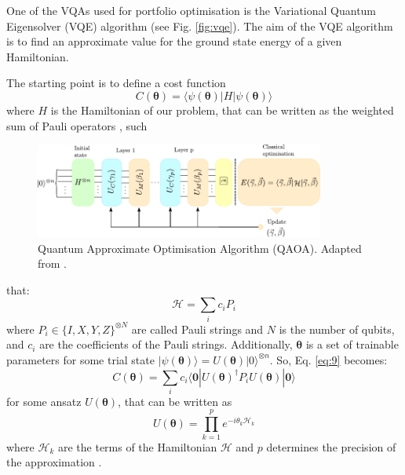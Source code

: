 \documentclass[prx,twocolumn,floatfix,superscriptaddress,longbibliography]{revtex4-1}
\begin{document}
One of the VQAs used for portfolio optimisation is the Variational Quantum Eigensolver (VQE) algorithm (see Fig. \ref{fig:vqe}). The aim of the VQE algorithm is to find an approximate value for the ground state energy of a given Hamiltonian.  

The starting point is to define a cost function
\begin{equation}
  \label{eq:9}
  C(\boldsymbol{\theta}) =\langle\psi(\boldsymbol{\theta})|H|\psi(\boldsymbol{\theta})\rangle
\end{equation}
where $H$ is the Hamiltonian of our problem, that can be written as the weighted sum of Pauli operators \cite{Tilly2022}, such
\begin{figure}[ht!]
  \begin{center} 
  \includegraphics[width=0.85\textwidth]{QAOA-Blekos.pdf}
  \caption{\label{fig:qaoa} Quantum Approximate Optimisation Algorithm (QAOA). Adapted from \cite{Blekos2024}.}
  \end{center}
\end{figure}
that: 
\begin{equation}
  \label{eq:10}
  \mathcal{H} = \sum_{i} c_i P_i
\end{equation}
where $P_i \in \{I, X, Y, Z\}^{\otimes N}$ are called Pauli strings and $N$ is the number of qubits, and $c_i$ are the coefficients of the Pauli strings.  Additionally, $\boldsymbol{\theta}$ is a set of trainable parameters for some trial state $|\psi(\boldsymbol{\theta})\rangle = U(\boldsymbol{\theta}) |0\rangle ^{\otimes n}$. So, Eq. \ref{eq:9} becomes:
\begin{equation}
  \label{eq:11}
  C(\boldsymbol{\theta}) =\sum_i c_i \langle \boldsymbol{0}|U(\boldsymbol{\theta})^\dagger P_i U(\boldsymbol{\theta})|\boldsymbol{0}\rangle
\end{equation}
for some ansatz $U(\boldsymbol{\theta})$, that can be written as
\begin{equation}
  \label{eq:12}
  U(\boldsymbol{\theta}) = \prod_{k=1}^{p} e^{-i\theta_k \mathcal{H}_k}
\end{equation}
where $\mathcal{H}_k$ are the terms of the Hamiltonian $\mathcal{H}$  and $p$ determines the precision of the approximation \cite{Cerezo2021}.
\end{document}
